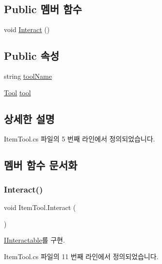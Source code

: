 \subsection*{Public 멤버 함수}
\begin{DoxyCompactItemize}
\item 
void \mbox{\hyperlink{class_item_tool_aaf220012be263b22a8834bf48d6a032c}{Interact}} ()
\end{DoxyCompactItemize}
\subsection*{Public 속성}
\begin{DoxyCompactItemize}
\item 
string \mbox{\hyperlink{class_item_tool_ae77e5af9e242f4ebbc1d27db2fd764d7}{tool\+Name}}
\item 
\mbox{\hyperlink{class_tool}{Tool}} \mbox{\hyperlink{class_item_tool_a9b51d0f3ce1a0b527ff241eaf4a042e4}{tool}}
\end{DoxyCompactItemize}


\subsection{상세한 설명}


Item\+Tool.\+cs 파일의 5 번째 라인에서 정의되었습니다.



\subsection{멤버 함수 문서화}
\mbox{\label{class_item_tool_aaf220012be263b22a8834bf48d6a032c}} 
\subsubsection{\texorpdfstring{Interact()}{Interact()}}
{\footnotesize\ttfamily void Item\+Tool.\+Interact (\begin{DoxyParamCaption}{ }\end{DoxyParamCaption})}



\mbox{\hyperlink{interface_i_interactable_a6e8c9bc1f27bc2a5c81f674ceeac024c}{I\+Interactable}}를 구현.



Item\+Tool.\+cs 파일의 11 번째 라인에서 정의되었습니다.


